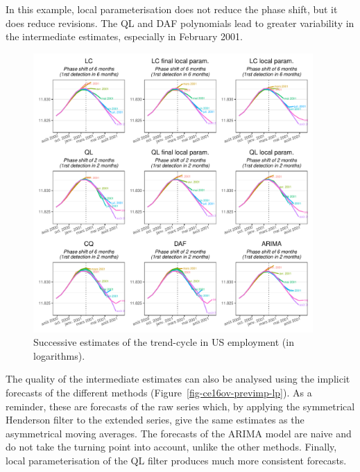 \documentclass[
]{article}
\newcommand\1{\mathds{1}}
\begin{document}
In this example, local parameterisation does not reduce the phase shift,
but it does reduce revisions. The QL and DAF polynomials lead to greater
variability in the intermediate estimates, especially in February 2001.

\begin{figure}[H]

\caption{\label{fig-ce16ovlp}Successive estimates of the trend-cycle in
US employment (in logarithms).}

{\centering \includegraphics[width=0.95\textwidth,height=\textheight]{img/nber/ce16ov_fev2001_lp.pdf}

}

\end{figure}

The quality of the intermediate estimates can also be analysed using the
implicit forecasts of the different methods
(Figure~\ref{fig-ce16ov-previmp-lp}). As a reminder, these are forecasts
of the raw series which, by applying the symmetrical Henderson filter to
the extended series, give the same estimates as the asymmetrical moving
averages. The forecasts of the ARIMA model are naive and do not take the
turning point into account, unlike the other methods. Finally, local
parameterisation of the QL filter produces much more consistent
forecasts.
\end{document}
